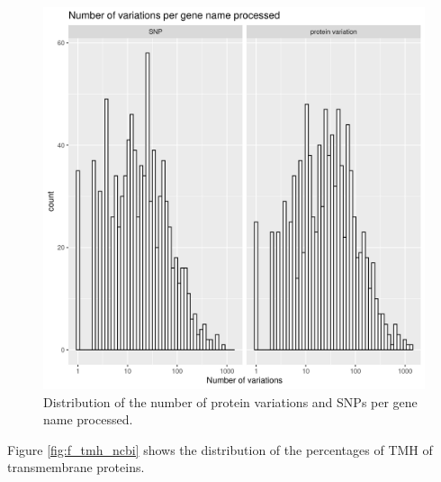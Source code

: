 \begin{figure}[!htbp]
  \includegraphics[width=\textwidth]{ncbi_peregrine_results/fig_snps_per_gene_name_processed.png}
  \caption{
    Distribution of the number of protein variations and SNPs per gene name processed.
  }
  \label{fig:snps_per_gene_name_processed}
\end{figure}

Figure \ref{fig:f_tmh_ncbi} shows the distribution 
of the percentages of TMH of transmembrane proteins.

